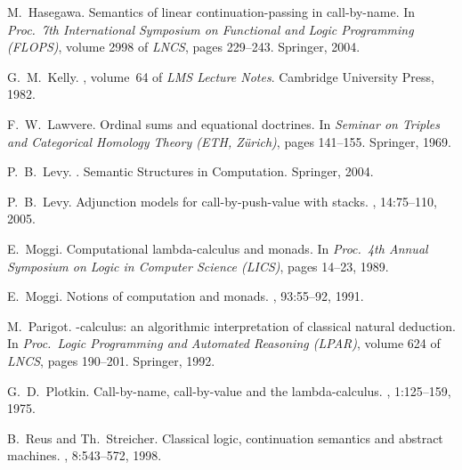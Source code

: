 \documentclass{LMCS}
\begin{document}
\begin{thebibliography}{BORT02}
M.\ Hasegawa.
\newblock Semantics of linear continuation-passing in call-by-name.
\newblock In {\em Proc.\ 7th International Symposium on Functional and Logic
  Programming (FLOPS)}, volume 2998 of {\em LNCS}, pages 229--243. Springer,
  2004.

G.~M.\ Kelly.
, volume~64 of {\em
  LMS Lecture Notes}.
\newblock Cambridge University Press, 1982.

F.~W.\ Lawvere.
\newblock Ordinal sums and equational doctrines.
\newblock In {\em Seminar on Triples and Categorical Homology Theory (ETH,
  Z\"{u}rich)}, pages 141--155. Springer, 1969.

P.~B.\ Levy.
.
\newblock Semantic Structures in Computation. Springer, 2004.

P.~B.\ Levy.
\newblock Adjunction models for call-by-push-value with stacks.
, 14:75--110, 2005.

E.\ Moggi.
\newblock Computational lambda-calculus and monads.
\newblock In {\em Proc.\ 4th Annual Symposium on Logic in Computer Science
  (LICS)}, pages 14--23, 1989.

E.\ Moggi.
\newblock Notions of computation and monads.
, 93:55--92, 1991.

M.\ Parigot.
\newblock -calculus: an algorithmic interpretation of classical
  natural deduction.
\newblock In {\em Proc.\ Logic Programming and Automated Reasoning (LPAR)},
  volume 624 of {\em LNCS}, pages 190--201. Springer, 1992.

G.~D.\ Plotkin.
\newblock Call-by-name, call-by-value and the lambda-calculus.
, 1:125--159, 1975.

B.\ Reus and Th.\ Streicher.
\newblock Classical logic, continuation semantics and abstract machines.
, 8:543--572, 1998.

\end{thebibliography}
\end{document}
